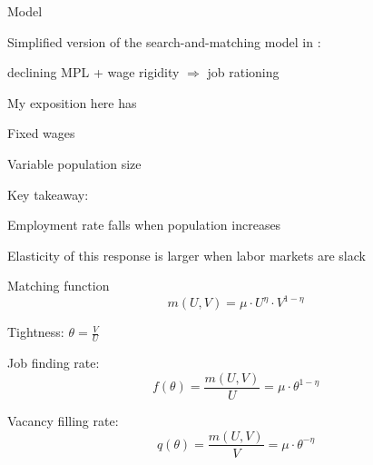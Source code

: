 \documentclass[aspectratio=169]{beamer}
\newenvironment{wideitemize}{\itemize\addtolength{\itemsep}{10pt}}{\enditemize}
\begin{document}
\begin{frame}{Model}
    \begin{wideitemize}
        \item Simplified version of the search-and-matching model in \textcite{michaillat_AER_2012_rationing_unemployment_bad_times}:
        \begin{wideitemize}
            \item declining MPL + wage rigidity $\Rightarrow$ job rationing
        \end{wideitemize}
        \item My exposition here has
        \begin{wideitemize}
            \item Fixed wages
            \item Variable population size
        \end{wideitemize}
        \item Key takeaway:
        \begin{wideitemize}
            \item Employment rate falls when population increases
            \item Elasticity of this response is larger when labor markets are slack
        \end{wideitemize}
    \end{wideitemize}
\end{frame}

\begin{frame}{Matching function}
    \begin{equation*}
        m(U,V) = \mu \cdot U^\eta \cdot V^{1-\eta}
    \end{equation*}
    \begin{wideitemize}
        \item Tightness: $\theta = \frac{V}{U}$
        \item Job finding rate: 
        \begin{equation*}
            f(\theta) = \frac{m(U,V)}{U} = \mu \cdot \theta^{1-\eta}
        \end{equation*}
        \item Vacancy filling rate:
        \begin{equation*}
            q(\theta) = \frac{m(U,V)}{V} = \mu \cdot \theta^{-\eta}
        \end{equation*}
    \end{wideitemize}
\end{frame}
\end{document}
